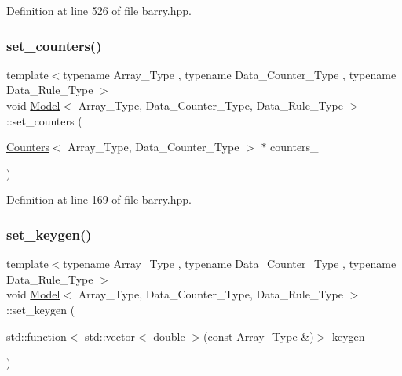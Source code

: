 Definition at line 526 of file barry.\+hpp.

\mbox{\label{classbarry_1_1_model_aab2ba8c90b888cfa2143bccf42fcb89f}} 
\subsubsection{\texorpdfstring{set\+\_\+counters()}{set\_counters()}}
{\footnotesize\ttfamily template$<$typename Array\+\_\+\+Type , typename Data\+\_\+\+Counter\+\_\+\+Type , typename Data\+\_\+\+Rule\+\_\+\+Type $>$ \\
void \hyperlink{classbarry_1_1_model}{Model}$<$ Array\+\_\+\+Type, Data\+\_\+\+Counter\+\_\+\+Type, Data\+\_\+\+Rule\+\_\+\+Type $>$\+::set\+\_\+counters (\begin{DoxyParamCaption}\item[{\hyperlink{classbarry_1_1_counters}{Counters}$<$ Array\+\_\+\+Type, Data\+\_\+\+Counter\+\_\+\+Type $>$ $\ast$}]{counters\+\_\+ }\end{DoxyParamCaption})\hspace{0.3cm}{\ttfamily [inline]}}



Definition at line 169 of file barry.\+hpp.

\mbox{\label{classbarry_1_1_model_add1847cdaf3f5bbde6c14efc2e4d16df}} 
\subsubsection{\texorpdfstring{set\+\_\+keygen()}{set\_keygen()}}
{\footnotesize\ttfamily template$<$typename Array\+\_\+\+Type , typename Data\+\_\+\+Counter\+\_\+\+Type , typename Data\+\_\+\+Rule\+\_\+\+Type $>$ \\
void \hyperlink{classbarry_1_1_model}{Model}$<$ Array\+\_\+\+Type, Data\+\_\+\+Counter\+\_\+\+Type, Data\+\_\+\+Rule\+\_\+\+Type $>$\+::set\+\_\+keygen (\begin{DoxyParamCaption}\item[{std\+::function$<$ std\+::vector$<$ double $>$(const Array\+\_\+\+Type \&)$>$}]{keygen\+\_\+ }\end{DoxyParamCaption})\hspace{0.3cm}{\ttfamily [inline]}}



